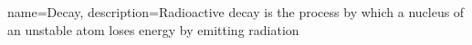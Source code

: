 {
    name=Decay,
    description={Radioactive decay is the process by which a nucleus of an unstable atom loses energy by emitting radiation}
    }
